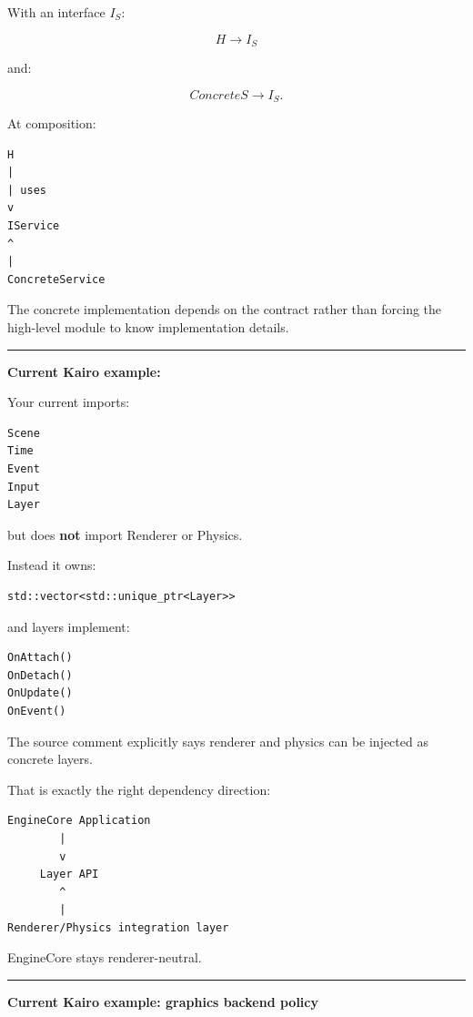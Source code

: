 With an interface \(I_S\):

\[
H\rightarrow I_S
\]

and:

\[
ConcreteS\rightarrow I_S.
\]

At composition:

\begin{verbatim}
H
|
| uses
v
IService
^
|
ConcreteService
\end{verbatim}

The concrete implementation depends on the contract rather than forcing the high-level module to know implementation details.

\begin{center}\rule{0.5\linewidth}{0.5pt}\end{center}

\textbf{Current Kairo example: }

Your current  imports:

\begin{verbatim}
Scene
Time
Event
Input
Layer
\end{verbatim}

but does \textbf{not} import Renderer or Physics.

Instead it owns:

\begin{verbatim}
std::vector<std::unique_ptr<Layer>>
\end{verbatim}

and layers implement:

\begin{verbatim}
OnAttach()
OnDetach()
OnUpdate()
OnEvent()
\end{verbatim}

The source comment explicitly says renderer and physics can be injected as concrete layers.

That is exactly the right dependency direction:

\begin{verbatim}
EngineCore Application
        |
        v
     Layer API
        ^
        |
Renderer/Physics integration layer
\end{verbatim}

EngineCore stays renderer-neutral.

\begin{center}\rule{0.5\linewidth}{0.5pt}\end{center}

\textbf{Current Kairo example: graphics backend policy}

